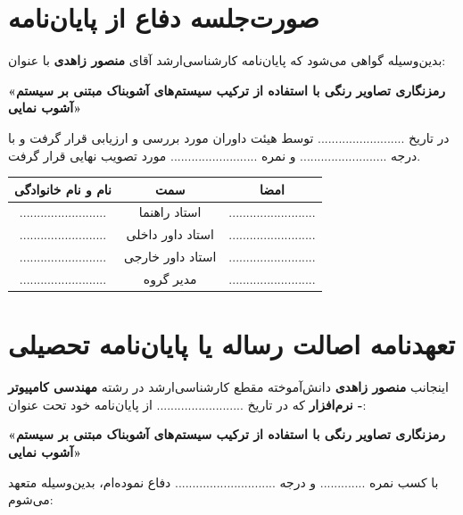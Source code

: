 \documentclass[a4paper,12pt]{report}
\renewcommand{\%}{\lr{\oldpercent}}
\begin{document}
\chapter*{صورت‌جلسه دفاع از پایان‌نامه}

بدین‌وسیله گواهی می‌شود که پایان‌نامه کارشناسی‌ارشد آقای \textbf{منصور زاهدی} با عنوان:
\begin{center}
\textbf{«رمزنگاری تصاویر رنگی با استفاده از ترکیب سیستم‌های آشوبناک مبتنی بر سیستم آشوب نمایی»}
\end{center}
در تاریخ ......................... توسط هیئت داوران مورد بررسی و ارزیابی قرار گرفت و با درجه ......................... و نمره ......................... مورد تصویب نهایی قرار گرفت.

\vspace{2cm}

\begin{center}
\begin{tabular}{ccc}
\textbf{نام و نام خانوادگی} & \textbf{سمت} & \textbf{امضا} \\ \hline
......................... & استاد راهنما & ......................... \\
......................... & استاد داور داخلی & ......................... \\
......................... & استاد داور خارجی & ......................... \\
......................... & مدیر گروه & ......................... \\
\end{tabular}
\end{center}

\newpage
\chapter*{تعهدنامه اصالت رساله یا پایان‌نامه تحصیلی}

اینجانب \textbf{منصور زاهدی} دانش‌آموخته مقطع کارشناسی‌ارشد در رشته \textbf{مهندسی کامپیوتر - نرم‌افزار} که در تاریخ ......................... از پایان‌نامه خود تحت عنوان:
\begin{center}
\textbf{«رمزنگاری تصاویر رنگی با استفاده از ترکیب سیستم‌های آشوبناک مبتنی بر سیستم آشوب نمایی»}
\end{center}
با کسب نمره ............. و درجه ............................. دفاع نموده‌ام، بدین‌وسیله متعهد می‌شوم:
\end{document}

